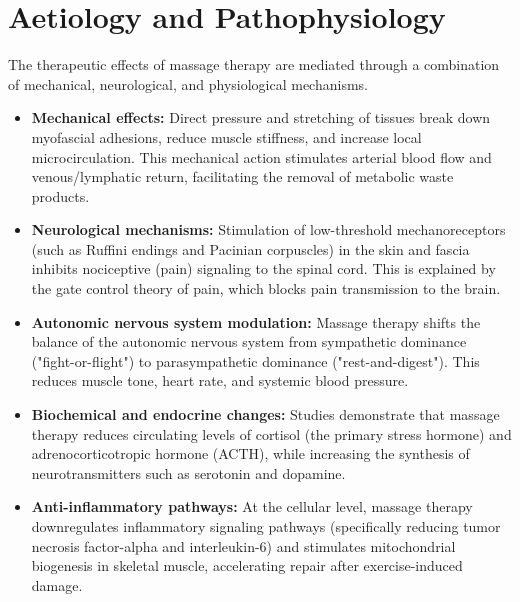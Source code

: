 \section*{Aetiology and Pathophysiology}
The therapeutic effects of massage therapy are mediated through a combination of mechanical, neurological, and physiological mechanisms.
\begin{itemize}
    \item \textbf{Mechanical effects:} Direct pressure and stretching of tissues break down myofascial adhesions, reduce muscle stiffness, and increase local microcirculation. This mechanical action stimulates arterial blood flow and venous/lymphatic return, facilitating the removal of metabolic waste products.
    \item \textbf{Neurological mechanisms:} Stimulation of low-threshold mechanoreceptors (such as Ruffini endings and Pacinian corpuscles) in the skin and fascia inhibits nociceptive (pain) signaling to the spinal cord. This is explained by the gate control theory of pain, which blocks pain transmission to the brain.
    \item \textbf{Autonomic nervous system modulation:} Massage therapy shifts the balance of the autonomic nervous system from sympathetic dominance ("fight-or-flight") to parasympathetic dominance ("rest-and-digest"). This reduces muscle tone, heart rate, and systemic blood pressure.
    \item \textbf{Biochemical and endocrine changes:} Studies demonstrate that massage therapy reduces circulating levels of cortisol (the primary stress hormone) and adrenocorticotropic hormone (ACTH), while increasing the synthesis of neurotransmitters such as serotonin and dopamine.
    \item \textbf{Anti-inflammatory pathways:} At the cellular level, massage therapy downregulates inflammatory signaling pathways (specifically reducing tumor necrosis factor-alpha and interleukin-6) and stimulates mitochondrial biogenesis in skeletal muscle, accelerating repair after exercise-induced damage.
\end{itemize}


